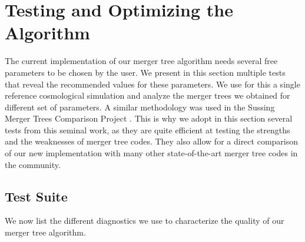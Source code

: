 \chapter{Testing and Optimizing the Algorithm}\label{chap:tests}

The current implementation of our merger tree algorithm needs several
free parameters to be chosen by the user. We present in this section
multiple tests that reveal the recommended values for these
parameters.  We use for this a single reference cosmological
simulation and analyze the merger trees we obtained for different set
of parameters.  A similar methodology was used in the Sussing Merger
Trees Comparison Project \citep{SUSSING_COMPARISON,
  SUSSING_CONVERGENCE, SUSSING_HALOFINDER,leeSussingMergerTrees2014}.
This is why we adopt in this section several tests from this seminal
work, as they are quite efficient at testing the strengths and the
weaknesses of merger tree codes. They also allow for a direct
comparison of our new implementation with many other state-of-the-art
merger tree codes in the community.






\section{Test Suite}\label{chap:testing_methods}

We now list the different diagnostics we use to characterize the quality of
our merger tree algorithm.

